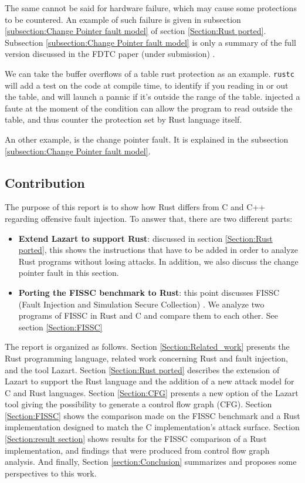 The same cannot be said for hardware failure, which may cause some protections to be countered.
An example of such failure is given in subsection \ref{subsection:Change Pointer fault model} of section \ref{Section:Rust ported}.
Subsection \ref{subsection:Change Pointer fault model} is only a summary of the full version discussed in the FDTC paper (under submission) \cite{fdct2026}. 

We can take the buffer overflows of a table rust protection as an example.
\texttt{rustc} will add a test on the code at compile time, to identify if you reading in or out the table, and will launch a pannic if it's outside the range of the table.
injected a faute at the moment of the condition can allow the program to read outside the table, and thus counter the protection set by Rust language itself.

An other example, is the change pointer fault. It is explained in the subsection \ref{subsection:Change Pointer fault model}.

\subsection{Contribution}
 
The purpose of this report is to show how Rust differs from C and C++ regarding offensive fault injection.
To answer that, there are two different parts:

\begin{itemize}
\item \textbf{Extend Lazart to support Rust}: discussed in section \ref{Section:Rust ported}, this shows the instructions that have to be added in order to analyze Rust programs without losing attacks. In addition, we also discuss the change pointer fault in this section.
\item \textbf{Porting the FISSC benchmark to Rust}: this point discusses FISSC (Fault Injection and Simulation Secure Collection) \cite{dureuil2016}. We analyze two programs of FISSC in Rust and C and compare them to each other. See section \ref{Section:FISSC}
\end{itemize}

The report is organized as follows. Section \ref{Section:Related_work} presents the Rust programming language, related work concerning Rust and fault injection, and the tool Lazart. Section \ref{Section:Rust ported} describes the extension of Lazart to support the Rust language and the addition of a new attack model for C and Rust languages. Section \ref{Section:CFG} presents a new option of the Lazart tool giving the possibility to generate a control flow graph (CFG). Section \ref{Section:FISSC} shows the comparison made on the FISSC benchmark and a Rust implementation designed to match the C implementation's attack surface. Section \ref{Section:result section} shows results for the FISSC comparison of a Rust implementation, and findings that were produced from control flow graph analysis. And finally, Section \ref{section:Conclusion} summarizes and proposes some perspectives to this work.

